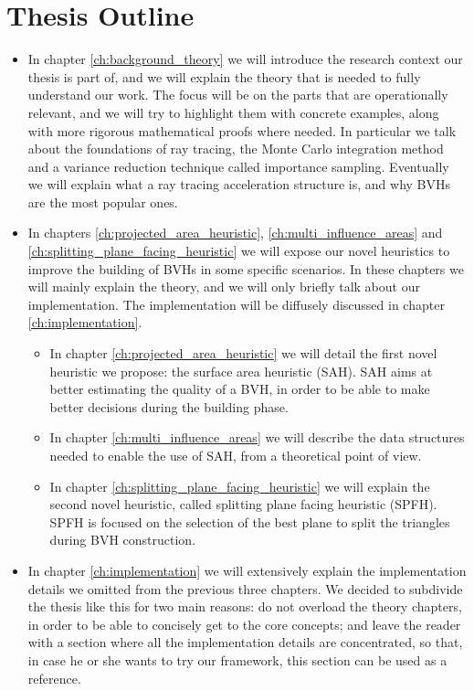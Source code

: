 \documentclass{PoliMi_MasterThesis}
\begin{document}
\section*{Thesis Outline}
\begin{itemize}
	\item In chapter \ref{ch:background_theory} we will introduce the research context our thesis is part of, and we will explain the theory that is needed to fully understand our work. The focus will be on the parts that are operationally relevant, and we will try to highlight them with concrete examples, along with more rigorous mathematical proofs where needed. In particular we talk about the foundations of ray tracing, the Monte Carlo integration method and a variance reduction technique called importance sampling. Eventually we will explain what a ray tracing acceleration structure is, and why BVHs are the most popular ones.
	\item In chapters \ref{ch:projected_area_heuristic}, \ref{ch:multi_influence_areas} and \ref{ch:splitting_plane_facing_heuristic} we will expose our novel heuristics to improve the building of BVHs in some specific scenarios. In these chapters we will mainly explain the theory, and we will only briefly talk about our implementation. The implementation will be diffusely discussed in chapter \ref{ch:implementation}.
	\begin{itemize}
		\item In chapter \ref{ch:projected_area_heuristic} we will detail the first novel heuristic we propose: the surface area heuristic (SAH). SAH aims at better estimating the quality of a BVH, in order to be able to make better decisions during the building phase.
		\item In chapter \ref{ch:multi_influence_areas} we will describe the data structures needed to enable the use of SAH, from a theoretical point of view.
		\item In chapter \ref{ch:splitting_plane_facing_heuristic} we will explain the second novel heuristic, called splitting plane facing heuristic (SPFH). SPFH is focused on the selection of the best plane to split the triangles during BVH construction.
	\end{itemize}
	\item In chapter \ref{ch:implementation} we will extensively explain the implementation details we omitted from the previous three chapters. We decided to subdivide the thesis like this for two main reasons: do not overload the theory chapters, in order to be able to concisely get to the core concepts; and leave the reader with a section where all the implementation details are concentrated, so that, in case he or she wants to try our framework, this section can be used as a reference.

\end{itemize}
\end{document}

